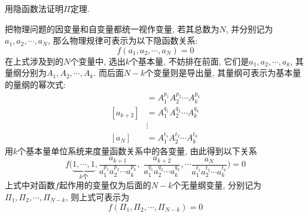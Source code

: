 \begin{problem}[08]
用隐函数法证明$\Pi$定理.
\end{problem}
\begin{solution}
把物理问题的因变量和自变量都统一视作变量, 若其总数为$N$, 并分别记为$a_1,a_2,\cdots,a_N$, 那么物理规律可表示为以下隐函数关系:
\[
f(a_1, a_2, \cdots, a_N) = 0
\]
在上式涉及到的$N$个变量中, 选出$k$个基本量, 不妨排在前面, 它们是$a_1,a_2,\cdots,a_k$, 其量纲分别为$A_1, A_2, \cdots, A_k$. 而后面$N-k$个变量则是导出量, 其量纲可表示为基本量的量纲的幂次式:
\begin{align*}
[a_{k+1}] & =A_{1}^{p_{1}}A_{2}^{p_{2}}\cdots A_{k}^{p_{k}}\\{}
[a_{k+2}] & =A_{1}^{q_{1}}A_{2}^{q_{2}}\cdots A_{k}^{q_{k}}\\
& \vdots\\{}
[a_{N}] & =A_{1}^{t_{1}}A_{2}^{t_{2}}\cdots A_{k}^{t_{k}}
\end{align*}
用$k$个基本量单位系统来度量函数关系中的各变量, 由此得到以下关系
\[
f\Bigg(\underbrace{1,\cdots,1}_{k\text{个}},\frac{a_{k+1}}{a_{1}^{p_{1}}a_{2}^{p_{2}}\cdots a_{k}^{p_{k}}},\; \frac{a_{k+2}}{a_{1}^{q_{1}}a_{2}^{q_{2}}\cdots a_{k}^{q_{k}}},\cdots\frac{a_{N}}{a_{1}^{t_{1}}a_{2}^{t_{2}}\cdots a_{k}^{t_{k}}}\Bigg)=0
\]
上式中对函数$f$起作用的变量仅为后面的$N-k$个无量纲变量, 分别记为$\Pi_1,\Pi_2,\cdots, \Pi_{N-k}$, 则上式可表示为
\[
f(\Pi_1,\Pi_2,\cdots, \Pi_{N-k})=0
\]
\end{solution}

